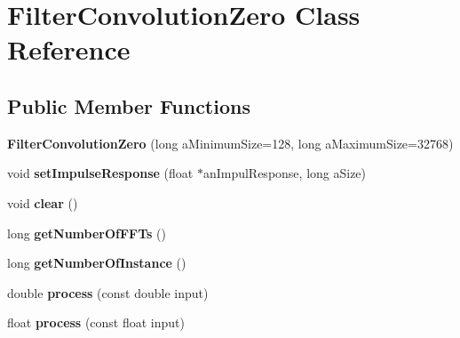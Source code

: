 \hypertarget{class_filter_convolution_zero}{\section{Filter\-Convolution\-Zero Class Reference}
\label{class_filter_convolution_zero}
}
\subsection*{Public Member Functions}
\begin{DoxyCompactItemize}
\item 
\hypertarget{class_filter_convolution_zero_ad8b99b17449c1f06f63679ff0f0f9daf}{{\bfseries Filter\-Convolution\-Zero} (long a\-Minimum\-Size=128, long a\-Maximum\-Size=32768)}\label{class_filter_convolution_zero_ad8b99b17449c1f06f63679ff0f0f9daf}

\item 
\hypertarget{class_filter_convolution_zero_a8beb3fe66957237230d49bf0c29c7a6a}{void {\bfseries set\-Impulse\-Response} (float $\ast$an\-Impul\-Response, long a\-Size)}\label{class_filter_convolution_zero_a8beb3fe66957237230d49bf0c29c7a6a}

\item 
\hypertarget{class_filter_convolution_zero_a99587aba1900a8321fc8dce7bc9f1c61}{void {\bfseries clear} ()}\label{class_filter_convolution_zero_a99587aba1900a8321fc8dce7bc9f1c61}

\item 
\hypertarget{class_filter_convolution_zero_a5ac3b6f34c2abf7d74547f5a49b349d8}{long {\bfseries get\-Number\-Of\-F\-F\-Ts} ()}\label{class_filter_convolution_zero_a5ac3b6f34c2abf7d74547f5a49b349d8}

\item 
\hypertarget{class_filter_convolution_zero_a17f92e18bd1f8bd10a5efc7bc6c1510c}{long {\bfseries get\-Number\-Of\-Instance} ()}\label{class_filter_convolution_zero_a17f92e18bd1f8bd10a5efc7bc6c1510c}

\item 
\hypertarget{class_filter_convolution_zero_a96938a69a33f3a9c85f3c2ce21e7e40f}{double {\bfseries process} (const double input)}\label{class_filter_convolution_zero_a96938a69a33f3a9c85f3c2ce21e7e40f}

\item 
\hypertarget{class_filter_convolution_zero_a8a6f23806e836d06ef8aaa4aebaded38}{float {\bfseries process} (const float input)}\label{class_filter_convolution_zero_a8a6f23806e836d06ef8aaa4aebaded38}

\end{DoxyCompactItemize}
